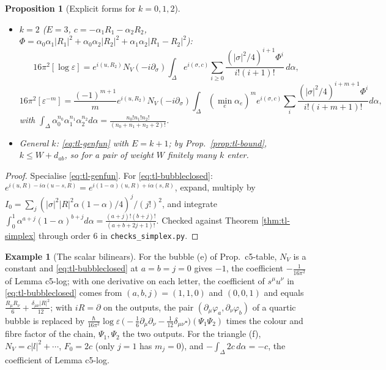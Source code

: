 \documentclass[11pt]{article}
\numberwithin{equation}{section}
\theoremstyle{plain}
\newtheorem{proposition}[theorem]{Proposition}
\theoremstyle{definition}
\newtheorem{example}[theorem]{Example}
\begin{document}
\begin{proposition}[Explicit forms for $k=0,1,2$]
\begin{itemize}
i.e. in position space the pair $\varphi_a(x+s)\varphi_b(x+u)$ is replaced by\[-\frac{\hbar}{16\pi^2}\sum_{a,b,j}\frac{(a+j)!(b+j)!}{a!b!(j!)^2(a+b+2j+1)!}(s,\partial)^a(u,\partial)^b|u-s|^{2j}(-\tfrac14\square)^j\] applied to the product of the outputs, times the colour and fibre factors of the chain.
\item $k=2$ ($E=3$, $c=-\alpha_1R_1-\alpha_2R_2$, $\Phi=\alpha_0\alpha_1|R_1|^2+\alpha_0\alpha_2|R_2|^2+\alpha_1\alpha_2|R_1-R_2|^2$):
\[
16\pi^2[\log\varepsilon]=e^{i(u,R_2)}N_V(-i\partial_\sigma)\int_\Delta e^{i(\sigma,c)}\sum_{i\ge0}\frac{(|\sigma|^2/4)^{i+1}\Phi^i}{i!(i+1)!}\,d\alpha ,\]\[16\pi^2[\varepsilon^{-m}]=\frac{(-1)^{m+1}}me^{i(u,R_2)}N_V(-i\partial_\sigma)\int_\Delta(\min_e\alpha_e)^me^{i(\sigma,c)}\sum_i\frac{(|\sigma|^2/4)^{i+m+1}\Phi^i}{i!(i+m+1)!}d\alpha,
\]
with $\int_\Delta\alpha_0^{n_0}\alpha_1^{n_1}\alpha_2^{n_2}d\alpha=\frac{n_0!n_1!n_2!}{(n_0+n_1+n_2+2)!}$.
\item General $k$: \eqref{eq:tl-genfun} with $E=k+1$; by Prop.~\ref{prop:tl-bound}, $k\le W+d_{ab}$, so for a pair of weight $W$ finitely many $k$ enter.
\end{itemize}
\end{proposition}

\begin{proof}
Specialise \eqref{eq:tl-genfun}. For \eqref{eq:tl-bubbleclosed}: $e^{i(u,R)-i\alpha(u-s,R)}=e^{i(1-\alpha)(u,R)+i\alpha(s,R)}$, expand, multiply by $I_0=\sum_j(|\sigma|^2|R|^2\alpha(1-\alpha)/4)^j/(j!)^2$, and integrate $\int_0^1\alpha^{a+j}(1-\alpha)^{b+j}d\alpha=\frac{(a+j)!(b+j)!}{(a+b+2j+1)!}$. Checked against Theorem \ref{thm:tl-simplex} through order $6$ in \texttt{checks\_simplex.py}.
\end{proof}

\begin{example}[The scalar bilinears]
For the bubble (e) of Prop.~c5-table, $N_V$ is a constant and \eqref{eq:tl-bubbleclosed} at $a=b=j=0$ gives $-1$, the coefficient $-\frac1{16\pi^2}$ of Lemma c5-log; with one derivative on each letter, the coefficient of $s^\mu u^\nu$ in \eqref{eq:tl-bubbleclosed} comes from $(a,b,j)=(1,1,0)$ and $(0,0,1)$ and equals $\frac{R_\mu R_\nu}6+\frac{\delta_{\mu\nu}|R|^2}{12}$; with $iR=\partial$ on the outputs, the pair $(\partial_\mu\varphi_a,\partial_\nu\varphi_b)$ of a quartic bubble is replaced by $\frac{\hbar}{16\pi^2}\log\varepsilon\,\big(-\tfrac16\partial_\mu\partial_\nu-\tfrac1{12}\delta_{\mu\nu}\square\big)(\Psi_1\Psi_2)$ times the colour and fibre factor of the chain, $\Psi_1,\Psi_2$ the two outputs. For the triangle (f), $N_V=c|l|^2+\cdots$, $F_0=2c$ (only $j=1$ has $m_j=0$), and $-\int_\Delta2c\,d\alpha=-c$, the coefficient of Lemma c5-log.
\end{example}
\end{document}
